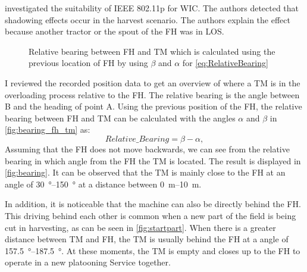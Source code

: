 \textcite{klingler_agriculture_2018} investigated the suitability of IEEE 802.11p for \ac{WIC}. The authors detected that shadowing effects occur in the harvest scenario. The authors explain the effect because another tractor or the spout of the \ac{FH} was in \ac{LOS}.
\begin{figure}%
	\centering
	\caption{Relative bearing between \ac{FH} and \ac{TM} which is calculated using the previous location of \ac{FH} by using $\beta$ and $\alpha$ for \autoref{eq:RelativeBearing}}%
	\label{fig:bearing_fh_tm}%
\end{figure}
I reviewed the recorded position data to get an overview of where a \ac{TM} is in the overloading process relative to the \ac{FH}. The relative bearing is the angle between B and the heading of point A. Using the previous position of the \ac{FH}, the relative bearing between \ac{FH} and \ac{TM} can be calculated with the angles $\alpha$ and $\beta$ in \autoref{fig:bearing_fh_tm} as:
\begin{equation}\label{eq:RelativeBearing}
	Relative\_Bearing = \beta - \alpha	,
\end{equation}
Assuming that the \ac{FH} does not move backwards, we can see from the relative bearing in which angle from the \ac{FH} the \ac{TM} is located. The result is displayed in \autoref{fig:bearing}. It can be observed that the \ac{TM} is mainly close to the \ac{FH} at an angle of \SIrange{30}{150}{\degree} at a distance between \SIrange{0}{10}{\metre}. 

In addition, it is noticeable that the machine can also be directly behind the \ac{FH}. This driving behind each other is common when a new part of the field is being cut in harvesting, as can be seen in \autoref{fig:startpart}. When there is a greater distance between \ac{TM} and \ac{FH}, the \ac{TM} is usually behind the FH at a angle of \SIrange{157.5}{187.5}{\degree}. At these moments, the \ac{TM} is empty and closes up to the \ac{FH} to operate in a new platooning Service together. 

